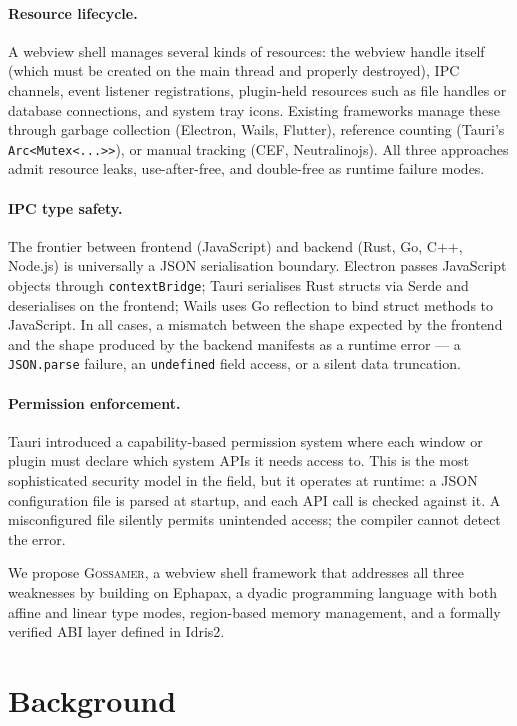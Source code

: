 \documentclass[11pt,a4paper]{article}
\theoremstyle{definition}
\begin{document}
\paragraph{Resource lifecycle.} A webview shell manages several kinds
of resources: the webview handle itself (which must be created on the
main thread and properly destroyed), IPC channels, event listener
registrations, plugin-held resources such as file handles or database
connections, and system tray icons. Existing frameworks manage these
through garbage collection (Electron, Wails, Flutter), reference
counting (Tauri's \texttt{Arc<Mutex<...>>}), or manual tracking
(CEF, Neutralinojs). All three approaches admit resource leaks,
use-after-free, and double-free as runtime failure modes.

\paragraph{IPC type safety.} The frontier between frontend (JavaScript)
and backend (Rust, Go, C++, Node.js) is universally a JSON serialisation
boundary. Electron passes JavaScript objects through
\texttt{contextBridge}; Tauri serialises Rust structs via Serde and
deserialises on the frontend; Wails uses Go reflection to bind struct
methods to JavaScript. In all cases, a mismatch between the shape
expected by the frontend and the shape produced by the backend manifests
as a runtime error --- a \texttt{JSON.parse} failure, an
\texttt{undefined} field access, or a silent data truncation.

\paragraph{Permission enforcement.} Tauri introduced a
capability-based permission system where each window or plugin must
declare which system APIs it needs access to. This is the most
sophisticated security model in the field, but it operates at runtime:
a JSON configuration file is parsed at startup, and each API call is
checked against it. A misconfigured file silently permits unintended
access; the compiler cannot detect the error.

\medskip

We propose \textsc{Gossamer}, a webview shell framework that addresses
all three weaknesses by building on Ephapax, a dyadic programming
language with both affine and linear type modes, region-based memory
management, and a formally verified ABI layer defined in Idris2.

\section{Background}
\label{sec:background}
\end{document}
